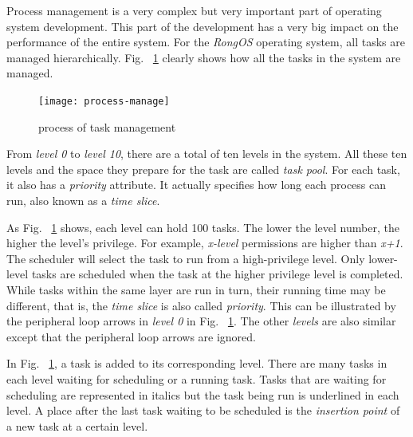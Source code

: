\documentclass{swfcthesis}
\begin{document}
Process management is a very complex but very important part of operating system
development. This part of the development has a very big impact on the performance of the
entire system. For the \emph{RongOS} operating system, all tasks are managed
hierarchically. Fig. ~\ref{fig:proc-manage} clearly shows how all the tasks in the system
are managed.



\begin{figure}[!ht]
  \centering
  \texttt{[image: process-manage]}
  \caption{process of task management}
  \label{fig:proc-manage}
\end{figure}



From \emph{level 0} to \emph{level 10}, there are a total of ten levels in
the system. All these ten levels and the space they prepare for the task are called \emph{task
  pool}. For each task, it also has a \emph{priority} attribute. It actually specifies how
long each process can run, also known as a \emph{time slice}. 


As Fig. ~\ref{fig:proc-manage} shows, each level can hold 100 tasks. The lower the
level number, the higher the level's privilege. For example, \emph{x-level} permissions are
higher than \emph{x+1}. The scheduler will select the task to run from a high-privilege
level. Only lower-level tasks are scheduled when the task at the higher privilege level is
completed. While tasks within the same layer are run in turn, their running time may be
different, that is,  the \emph{time slice} is also called \emph{priority}. This can be
illustrated by the peripheral loop arrows in \emph{level 0} in
Fig. ~\ref{fig:proc-manage}. The other \emph{levels} are also similar except that the
peripheral loop arrows are ignored.



In Fig. ~\ref{fig:proc-manage}, a task is added to its corresponding
level. There are many tasks in each level waiting for scheduling or a running task. Tasks
that are waiting for scheduling are represented in italics but the task being run is
underlined in each level. A place after the last task waiting to be scheduled is the
\emph{insertion point} of a new task at a certain level.
\end{document}
